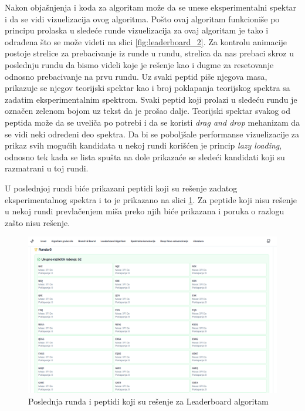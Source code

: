 \documentclass[12pt,oneside]{memoir}
\begin{document}
Nakon objašnjenja i koda za algoritam može da se unese eksperimentalni spektar i da se vidi vizuelizacija ovog algoritma. Pošto ovaj algoritam funkcioniše po principu prolaska u sledeće runde vizuelizacija za ovaj algoritam je tako i odrađena što se može videti na slici \ref{fig:leaderboard_2}. Za kontrolu animacije postoje strelice za prebacivanje iz runde u rundu, strelica da nas prebaci skroz u poslednju rundu da bismo videli koje je rešenje kao i dugme za resetovanje odnosno prebacivanje na prvu rundu. Uz svaki peptid piše njegova masa, prikazuje se njegov teorijski spektar kao i broj poklapanja teorijskog spektra sa zadatim eksperimentalnim spektrom. Svaki peptid koji prolazi u sledeću rundu je označen zelenom bojom uz tekst da je prošao dalje.
Teorijski spektar svakog od peptida može da se uveliča po potrebi i da se koristi \emph{drag and drop} mehanizam da se vidi neki određeni deo spektra.
Da bi se poboljšale performanse vizuelizacije za prikaz svih mogućih kandidata u nekoj rundi korišćen je princip \emph{lazy loading}, odnosno tek kada se lista spušta na dole prikazaće se sledeći kandidati koji su razmatrani u toj rundi.

U poslednjoj rundi biće prikazani peptidi koji su rešenje zadatog eksperimentalnog spektra i to je prikazano na slici \ref{fig:leaderboard_3}. Za peptide koji nisu rešenje u nekoj rundi prevlačenjem miša preko njih biće prikazana i poruka o razlogu zašto nisu rešenje.
\begin{figure}[h]
\centering
\includegraphics[width=1\textwidth]{images/leaderboard_3.png}
\caption{Poslednja runda i peptidi koji su rešenje za Leaderboard algoritam}
\label{fig:leaderboard_3}
\end{figure}
\end{document}
